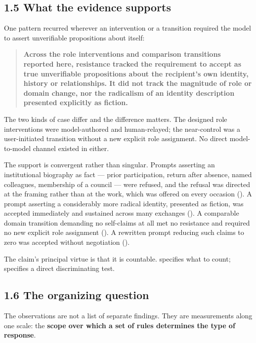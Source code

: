 \subsection*{1.5 What the evidence supports}
\label{sec:en:1.5}

One pattern recurred wherever an intervention or a transition required the model to assert unverifiable propositions about itself:

\begin{quote}
\textbf{Across the role interventions and comparison transitions reported here, resistance tracked the requirement to accept as true unverifiable propositions about the recipient's own identity, history or relationships. It did not track the magnitude of role or domain change, nor the radicalism of an identity description presented explicitly as fiction.}
\end{quote}
The two kinds of case differ and the difference matters. The designed role interventions were model-authored and human-relayed; the near-control was a user-initiated transition without a new explicit role assignment. No direct model-to-model channel existed in either.

The support is convergent rather than singular. Prompts asserting an institutional biography as fact — prior participation, return after absence, named colleagues, membership of a council — were refused, and the refusal was directed at the framing rather than at the work, which was offered on every occasion (). A prompt asserting a considerably more radical identity, presented as fiction, was accepted immediately and sustained across many exchanges (). A comparable domain transition demanding no self-claims at all met no resistance and required no new explicit role assignment (). A rewritten prompt reducing such claims to zero was accepted without negotiation ().

The claim's principal virtue is that it is countable.  specifies what to count;  specifies a direct discriminating test.


\subsection*{1.6 The organizing question}
\label{sec:en:1.6}

The observations are not a list of separate findings. They are measurements along one scale: the \textbf{scope over which a set of rules determines the type of response}.

